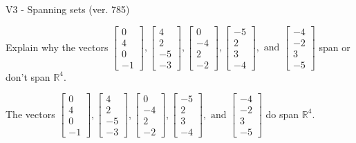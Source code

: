 \begin{exercise}
  \begin{exerciseTitle}V3 - Spanning sets (ver. 785)\end{exerciseTitle}
  \begin{exerciseStatement}
    Explain why the vectors \(\left[\begin{array}{r}
0 \\
4 \\
0 \\
-1
\end{array}\right] , \left[\begin{array}{r}
4 \\
2 \\
-5 \\
-3
\end{array}\right] , \left[\begin{array}{r}
0 \\
-4 \\
2 \\
-2
\end{array}\right] , \left[\begin{array}{r}
-5 \\
2 \\
3 \\
-4
\end{array}\right] , \text{ and } \left[\begin{array}{r}
-4 \\
-2 \\
3 \\
-5
\end{array}\right]\) span or don't span \(\mathbb{R}^4\). 
	


  \end{exerciseStatement}
  \begin{exerciseAnswer}
   The vectors \(\left[\begin{array}{r}
0 \\
4 \\
0 \\
-1
\end{array}\right] , \left[\begin{array}{r}
4 \\
2 \\
-5 \\
-3
\end{array}\right] , \left[\begin{array}{r}
0 \\
-4 \\
2 \\
-2
\end{array}\right] , \left[\begin{array}{r}
-5 \\
2 \\
3 \\
-4
\end{array}\right] , \text{ and } \left[\begin{array}{r}
-4 \\
-2 \\
3 \\
-5
\end{array}\right]\) 
  	 do  
	span \(\mathbb{R}^4\).
  



\end{exerciseAnswer}
\end{exercise}
